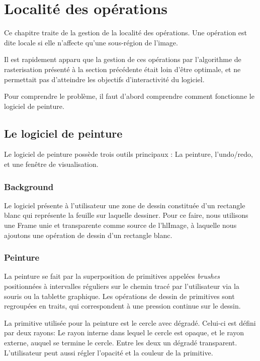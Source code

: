 \chapter{Localité des opérations}
	Ce chapitre traite de la gestion de la localité des opérations. Une
	opération est dite locale si elle n'affecte qu'une sous-région de l'image.

	Il est rapidement apparu que la gestion de ces opérations par l'algorithme
	de rasterisation présenté à la section précédente était loin d'être optimale,
	et ne permettait pas d'atteindre les objectifs d'interactivité du logiciel.

	Pour comprendre le problème, il faut d'abord comprendre comment fonctionne le
	logiciel de peinture. 
	\section{Le logiciel de peinture}
		Le logiciel de peinture possède trois outils principaux : La peinture,
		l'undo/redo, et une fenêtre de visualisation.
		\subsection{Background}
			Le logiciel présente à l'utilisateur une zone de dessin constituée d'un
			rectangle blanc qui représente la feuille sur laquelle dessiner. 
			Pour ce faire, nous utilisons une Frame unie et transparente comme source
			de l'hlImage, à laquelle nous ajoutons une opération de dessin d'un
			rectangle blanc. 
		\subsection{Peinture}
			La peinture se fait par la superposition de primitives appelées \emph{brushes}
			positionnées
			à intervalles réguliers sur le chemin tracé par l'utilisateur via la
			souris ou la tablette graphique. Les opérations de dessin de primitives 
			sont regroupées en traits, qui correspondent à une pression 
			continue sur le dessin. 

			La primitive utilisée pour la peinture est le cercle avec dégradé. Celui-ci
			est défini par deux rayons: Le rayon interne dans lequel le cercle est opaque,
			et le rayon externe, auquel se termine le cercle. Entre les deux un dégradé
			transparent. L'utilisateur peut aussi régler 
			l'opacité et la couleur de la primitive.

